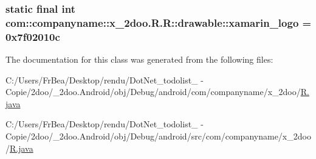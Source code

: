 \hypertarget{classcom_1_1companyname_1_1x__2doo_1_1_r_1_1drawable_3dac0ff091239a90efc49eb48874f999}{
\subsubsection[{xamarin\_\-logo}]{\setlength{\rightskip}{0pt plus 5cm}static final int com::companyname::x\_\-2doo.R.R::drawable::xamarin\_\-logo = 0x7f02010c}}
\label{classcom_1_1companyname_1_1x__2doo_1_1_r_1_1drawable_3dac0ff091239a90efc49eb48874f999}




The documentation for this class was generated from the following files:\begin{CompactItemize}
\item 
C:/Users/FrBea/Desktop/rendu/DotNet\_\-todolist\_ - Copie/2doo/\_\-2doo.Android/obj/Debug/android/com/companyname/x\_\-2doo/\hyperlink{com_2companyname_2x__2doo_2_r_8java}{R.java}\item 
C:/Users/FrBea/Desktop/rendu/DotNet\_\-todolist\_ - Copie/2doo/\_\-2doo.Android/obj/Debug/android/src/com/companyname/x\_\-2doo/\hyperlink{src_2com_2companyname_2x__2doo_2_r_8java}{R.java}\end{CompactItemize}
